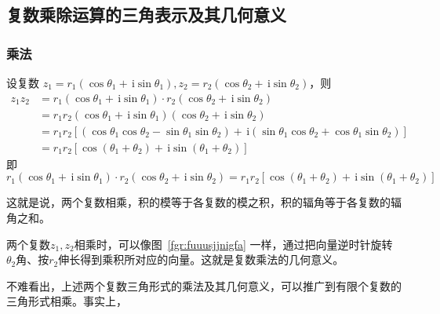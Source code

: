 \documentclass[a4paper,openany]{ctexbook}
\newcommand{\ii}{\,\mathrm{i}}
\begin{document}
\subsection{复数乘除运算的三角表示及其几何意义}

\subsubsection{乘法}

设复数 \(z_1=r_1(\cos \theta_1 + \,\mathrm{i} \sin \theta _1),z_2=r_2(\cos \theta_2 + \,\mathrm{i} \sin \theta _2)\)，则
\begin{align*}
    z_1z_2 & =r_1(\cos \theta_1 + \,\mathrm{i} \sin \theta _1)\cdot r_2(\cos \theta_2 + \,\mathrm{i} \sin \theta _2)                                   \\
           & =r_1r_2(\cos \theta_1 + \,\mathrm{i} \sin \theta _1)(\cos \theta_2 + \,\mathrm{i} \sin \theta _2)                                         \\
           & =r_1r_2[(\cos \theta _1 \cos \theta _2-\sin \theta _1 \sin \theta _2)+\ii(\sin \theta _1 \cos \theta _2 + \cos \theta _1 \sin \theta _2)] \\
           & =r_1r_2[\cos (\theta _1+\theta _2)+\ii \sin (\theta _1+\theta _2)]
\end{align*}
即
\[
    r_1(\cos \theta_1 + \,\mathrm{i} \sin \theta _1)\cdot r_2(\cos \theta_2 + \,\mathrm{i} \sin \theta _2)
    =r_1r_2[\cos (\theta _1+\theta _2)+\ii \sin (\theta _1+\theta _2)]
\]

这就是说，两个复数相乘，积的模等于各复数的模之积，积的辐角等于各复数的辐角之和。

两个复数\(z_1,z_2\)相乘时，可以像图~\ref{fgr:fuuusjjnigfa} 一样，通过把向量逆时针旋转\(\theta _2\)角、按\(r_2\)伸长得到乘积所对应的向量。这就是复数乘法的几何意义。

不难看出，上述两个复数三角形式的乘法及其几何意义，可以推广到有限个复数的三角形式相乘。事实上，
\end{document}
